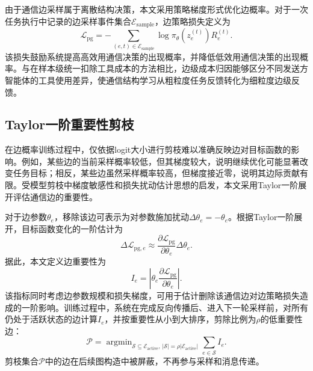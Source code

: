 由于通信边采样属于离散结构决策，本文采用策略梯度形式优化边概率。对于一次任务执行中记录的边采样事件集合$\mathcal{E}_{\mathrm{sample}}$，边策略损失定义为
\begin{equation}
  \mathcal{L}_{\mathrm{pg}}
  = - \sum_{(e,t) \in \mathcal{E}_{\mathrm{sample}}}
  \log \pi_\theta(z_e^{(t)}) R_e^{(t)}.
  \label{eq:policy-gradient-loss}
\end{equation}
该损失鼓励系统提高高效用通信决策的出现概率，并降低低效用通信决策的出现概率。与在样本级统一扣除工具成本的方法相比，边级成本归因能够区分不同发送方智能体的工具使用差异，使通信结构学习从粗粒度任务反馈转化为细粒度边级反馈。

\subsection{Taylor一阶重要性剪枝}

在边概率训练过程中，仅依据logit大小进行剪枝难以准确反映边对目标函数的影响。例如，某些边的当前采样概率较低，但其梯度较大，说明继续优化可能显著改变任务目标；相反，某些边虽然采样概率较高，但梯度接近零，说明其边际贡献有限。受模型剪枝中梯度敏感性和损失扰动估计思想的启发，本文采用Taylor一阶展开评估通信边的重要性\cite{ref102,ref104,ref105}。

对于边参数$\theta_e$，移除该边可表示为对参数施加扰动$\Delta\theta_e=-\theta_e$。根据Taylor一阶展开，目标函数变化的一阶估计为
\begin{equation}
  \Delta\mathcal{L}_{\mathrm{pg},e}
  \approx
  \frac{\partial \mathcal{L}_{\mathrm{pg}}}{\partial \theta_e}\Delta\theta_e.
  \label{eq:taylor-first-order}
\end{equation}
据此，本文定义边重要性为
\begin{equation}
  I_e = \left|\theta_e \frac{\partial \mathcal{L}_{\mathrm{pg}}}{\partial \theta_e}\right|.
  \label{eq:taylor-importance}
\end{equation}
该指标同时考虑边参数规模和损失梯度，可用于估计删除该通信边对边策略损失造成的一阶影响。训练过程中，系统在完成反向传播后、进入下一轮采样前，对所有仍处于活跃状态的边计算$I_e$，并按重要性从小到大排序，剪除比例为$\rho$的低重要性边：
\begin{equation}
  \mathcal{P}
  =
  \operatorname{argmin}_{\mathcal{S}\subseteq \mathcal{E}_{\mathrm{active}},\,|\mathcal{S}|=\rho|\mathcal{E}_{\mathrm{active}}|}
  \sum_{e\in \mathcal{S}} I_e.
  \label{eq:taylor-prune-set}
\end{equation}
剪枝集合$\mathcal{P}$中的边在后续图构造中被屏蔽，不再参与采样和消息传递。

